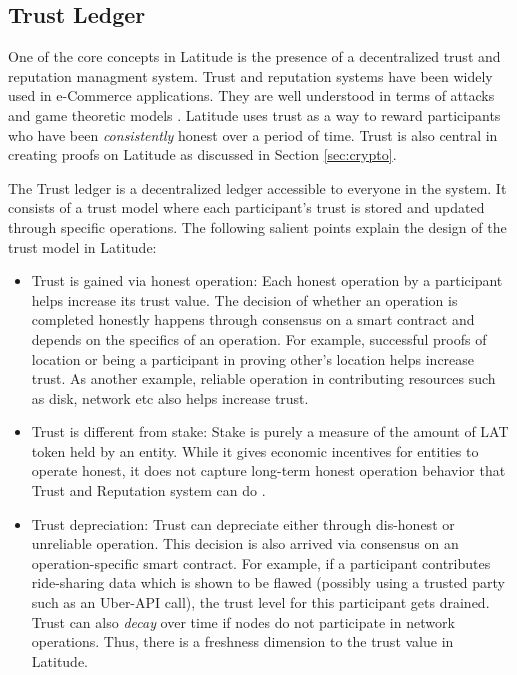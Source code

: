 
\subsection{Trust Ledger}
\label{sec:trust}

One of the core concepts in Latitude is the presence of a decentralized trust and reputation managment system. Trust and
reputation systems have been widely used in e-Commerce applications. They are well understood in terms of attacks and
game theoretic models \cite{rahimi_2017, rahimi_2012}. Latitude uses trust as a way to reward participants who have been
{\em consistently} honest over a period of time. Trust is also central in creating proofs on Latitude as discussed in
Section \ref{sec:crypto}.

The Trust ledger is a decentralized ledger accessible to everyone in the system. It consists of a trust model where each
participant's trust is stored and updated through specific operations. The following salient points explain the design
of the trust model in Latitude:

\begin{itemize}
    \item Trust is gained via honest operation: Each honest operation by a participant helps increase its trust value.
        The decision of whether an operation is completed honestly happens through consensus on a smart contract and
        depends on the specifics of an operation. For example, successful proofs of location or being a participant in
        proving other's location helps increase trust. As another example, reliable operation in contributing resources
        such as disk, network etc also helps increase trust.
    \item Trust is different from stake: Stake is purely a measure of the amount of LAT token held by an entity. While
        it gives economic incentives for entities to operate honest, it does not capture long-term honest operation
        behavior that Trust and Reputation system can do \cite{dong_2010}.
    \item Trust depreciation: Trust can depreciate either through dis-honest or unreliable operation. This decision is
        also arrived via consensus on an operation-specific smart contract. For example, if a participant contributes
        ride-sharing data which is shown to be flawed (possibly using a trusted party such as an Uber-API call),
        the trust level for this participant gets drained. Trust can also {\em decay} over time if nodes do not
        participate in network operations. Thus, there is a freshness dimension to the trust value in Latitude.
\end{itemize}

